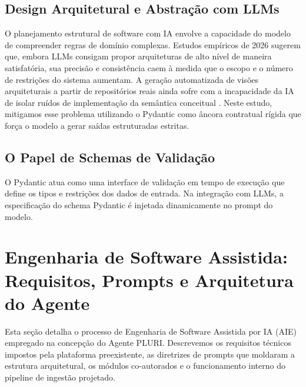 \documentclass[sigconf]{acmart}
\begin{document}
\subsection{Design Arquitetural e Abstração com LLMs}
O planejamento estrutural de software com IA envolve a capacidade do modelo de compreender regras de domínio complexas. Estudos empíricos de 2026 \cite{canai2026build} sugerem que, embora LLMs consigam propor arquiteturas de alto nível de maneira satisfatória, sua precisão e consistência caem à medida que o escopo e o número de restrições do sistema aumentam. A geração automatizada de visões arquiteturais a partir de repositórios reais ainda sofre com a incapacidade da IA de isolar ruídos de implementação da semântica conceitual \cite{automated2026view}. Neste estudo, mitigamos esse problema utilizando o Pydantic como âncora contratual rígida que força o modelo a gerar saídas estruturadas estritas.

\subsection{O Papel de Schemas de Validação}
O Pydantic atua como uma interface de validação em tempo de execução que define os tipos e restrições dos dados de entrada. Na integração com LLMs, a especificação do schema Pydantic é injetada dinamicamente no prompt do modelo.

\section{Engenharia de Software Assistida: Requisitos, Prompts e Arquitetura do Agente}
Esta seção detalha o processo de Engenharia de Software Assistida por IA (AIE) empregado na concepção do Agente PLURI. Descrevemos os requisitos técnicos impostos pela plataforma preexistente, as diretrizes de prompts que moldaram a estrutura arquitetural, os módulos co-autorados e o funcionamento interno do pipeline de ingestão projetado.
\end{document}
